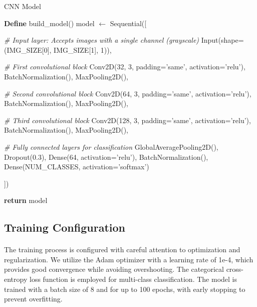 \begin{algorithm}[ht]
    \caption{CNN Model}\label{alg:cnnmodel}
    \begin{algorithmic}
        \STATE \textbf{Define} build\_model()
        \STATE model $\gets$ Sequential([

        \STATE \quad \textit{\# Input layer: Accepts images with a single channel (grayscale)}
        \STATE \quad Input(shape=(IMG\_SIZE[0], IMG\_SIZE[1], 1)),  

        \STATE

        \STATE \quad \textit{\# First convolutional block}
        \STATE \quad Conv2D(32, 3, padding='same', activation='relu'),
        \STATE \quad BatchNormalization(),
        \STATE \quad MaxPooling2D(),

        \STATE

        \STATE \quad \textit{\# Second convolutional block}
        \STATE \quad Conv2D(64, 3, padding='same', activation='relu'),
        \STATE \quad BatchNormalization(),
        \STATE \quad MaxPooling2D(),
        
        \STATE

        \STATE \quad \textit{\# Third convolutional block}
        \STATE \quad Conv2D(128, 3, padding='same', activation='relu'),
        \STATE \quad BatchNormalization(),
        \STATE \quad MaxPooling2D(),

        \STATE

        \STATE \quad \textit{\# Fully connected layers for classification}
        \STATE \quad GlobalAveragePooling2D(),
        \STATE \quad Dropout(0.3),
        \STATE \quad Dense(64, activation='relu'),
        \STATE \quad BatchNormalization(),
        \STATE \quad Dense(NUM\_CLASSES, activation='softmax')

        \STATE ])
        
        \STATE

        \STATE \textbf{return} model
    \end{algorithmic}
\end{algorithm}



\subsection{Training Configuration}
\label{subsec:training-configuration}

\paragraph{}
The training process is configured with careful attention to optimization and regularization. We utilize the Adam optimizer with a learning rate of 1e-4, which provides good convergence while avoiding overshooting. The categorical cross-entropy loss function is employed for multi-class classification. The model is trained with a batch size of 8 and for up to 100 epochs, with early stopping to prevent overfitting.

